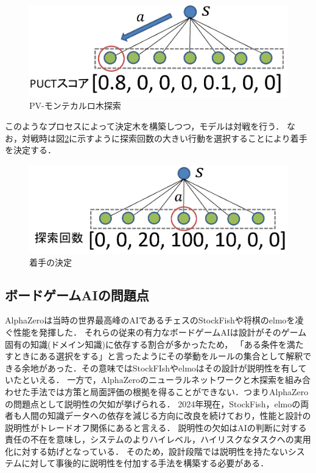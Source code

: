 \begin{figure}[htbp]
	\centering
	\includegraphics[width=\linewidth]{./figure/pv-mcts.png}
	\caption{PV-モンテカルロ木探索}
	\label{fig:pv-mcts}
\end{figure}
	
このようなプロセスによって決定木を構築しつつ，モデルは対戦を行う．
なお，対戦時は図\ref{fig:visit-count}に示すように探索回数の大きい行動を選択することにより着手を決定する．
\begin{figure}[htbp]
	\centering
	\includegraphics[width=\linewidth]{./figure/visit-count.png}
	\caption{着手の決定}
	\label{fig:visit-count}
\end{figure}

\subsection{ボードゲームAIの問題点}
AlphaZeroは当時の世界最高峰のAIであるチェスのStockFish\cite{StockFish}や将棋のelmo\cite{elmo}を凌ぐ性能を発揮した．
それらの従来の有力なボードゲームAIは設計がそのゲーム固有の知識(ドメイン知識)に依存する割合が多かったため，
「ある条件を満たすときにある選択をする」と言ったようにその挙動をルールの集合として解釈できる余地があった．その意味ではStockFIshやelmoはその設計が説明性を有していたといえる．
一方で，AlphaZeroのニューラルネットワークと木探索を組み合わせた手法では方策と局面評価の根拠を得ることができない．つまりAlphaZeroの問題点として説明性の欠如が挙げられる．
2024年現在，StockFish，elmoの両者も人間の知識データへの依存を減じる方向に改良を続けており，性能と設計の説明性がトレードオフ関係にあると言える\cite{elmo}\cite{StockFish13}．
説明性の欠如はAIの判断に対する責任の不在を意味し，システムのよりハイレベル，ハイリスクなタスクへの実用化に対する妨げとなっている．
そのため，設計段階では説明性を持たないシステムに対して事後的に説明性を付加する手法を構築する必要がある．




